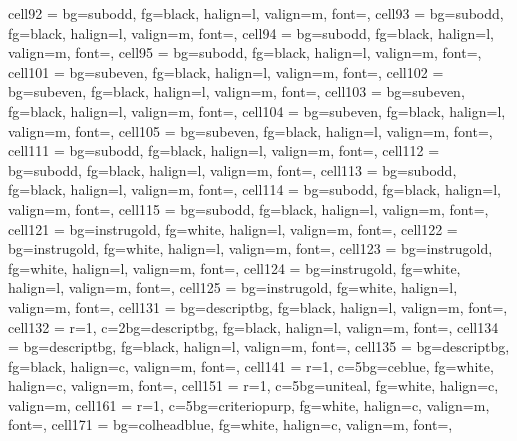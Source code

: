 \documentclass[a4paper,12pt]{article}
\begin{document}
\begin{longtblr}
{  cell{9}{2}  = {bg=subodd,  fg=black, halign=l, valign=m, font=\footnotesize},
  cell{9}{3}  = {bg=subodd,  fg=black, halign=l, valign=m, font=\footnotesize},
  cell{9}{4}  = {bg=subodd,  fg=black, halign=l, valign=m, font=\footnotesize},
  cell{9}{5}  = {bg=subodd,  fg=black, halign=l, valign=m, font=\footnotesize},
  cell{10}{1} = {bg=subeven, fg=black, halign=l, valign=m, font=\footnotesize},
  cell{10}{2} = {bg=subeven, fg=black, halign=l, valign=m, font=\footnotesize},
  cell{10}{3} = {bg=subeven, fg=black, halign=l, valign=m, font=\footnotesize},
  cell{10}{4} = {bg=subeven, fg=black, halign=l, valign=m, font=\footnotesize},
  cell{10}{5} = {bg=subeven, fg=black, halign=l, valign=m, font=\footnotesize},
  cell{11}{1} = {bg=subodd,  fg=black, halign=l, valign=m, font=\footnotesize},
  cell{11}{2} = {bg=subodd,  fg=black, halign=l, valign=m, font=\footnotesize},
  cell{11}{3} = {bg=subodd,  fg=black, halign=l, valign=m, font=\footnotesize},
  cell{11}{4} = {bg=subodd,  fg=black, halign=l, valign=m, font=\footnotesize},
  cell{11}{5} = {bg=subodd,  fg=black, halign=l, valign=m, font=\footnotesize},
  cell{12}{1} = {bg=instrugold, fg=white, halign=l, valign=m, font=\footnotesize},
  cell{12}{2} = {bg=instrugold, fg=white, halign=l, valign=m, font=\footnotesize},
  cell{12}{3} = {bg=instrugold, fg=white, halign=l, valign=m, font=\footnotesize},
  cell{12}{4} = {bg=instrugold, fg=white, halign=l, valign=m, font=\footnotesize},
  cell{12}{5} = {bg=instrugold, fg=white, halign=l, valign=m, font=\footnotesize},
  cell{13}{1} = {bg=descriptbg, fg=black, halign=l, valign=m, font=\footnotesize},
  cell{13}{2} = {r=1, c=2}{bg=descriptbg, fg=black, halign=l, valign=m, font=\footnotesize},
  cell{13}{4} = {bg=descriptbg, fg=black, halign=l, valign=m, font=\footnotesize},
  cell{13}{5} = {bg=descriptbg, fg=black, halign=c, valign=m, font=\footnotesize\bfseries},
  cell{14}{1} = {r=1, c=5}{bg=ceblue, fg=white, halign=c, valign=m, font=\small\bfseries},
  cell{15}{1} = {r=1, c=5}{bg=uniteal, fg=white, halign=c, valign=m},
  cell{16}{1} = {r=1, c=5}{bg=criteriopurp, fg=white, halign=c, valign=m, font=\small\bfseries},
  cell{17}{1} = {bg=colheadblue, fg=white, halign=c, valign=m, font=\bfseries},
}
\end{longtblr}
\end{document}
